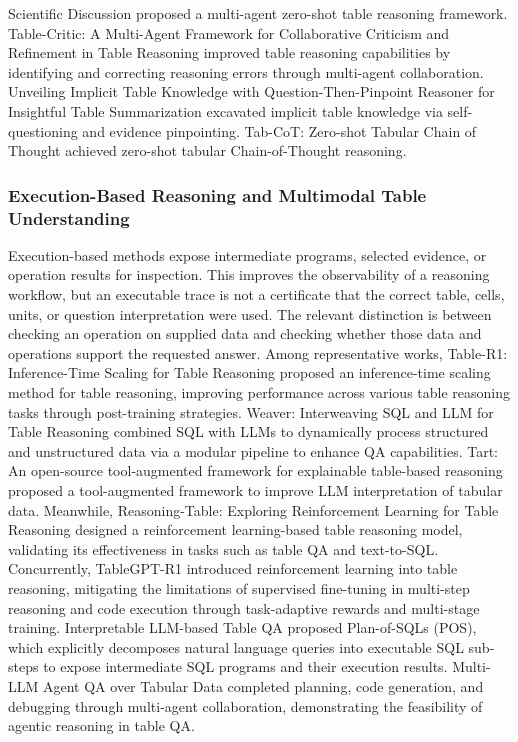 Scientific Discussion \cite{liu2024paneltr} proposed a multi-agent zero-shot table reasoning framework. Table-Critic: A Multi-Agent Framework for Collaborative Criticism and Refinement in Table Reasoning \cite{zhang2024tablecritic} improved table reasoning capabilities by identifying and correcting reasoning errors through multi-agent collaboration. Unveiling Implicit Table Knowledge with Question-Then-Pinpoint Reasoner for Insightful Table Summarization \cite{kim2024qtp} excavated implicit table knowledge via self-questioning and evidence pinpointing. Tab-CoT: Zero-shot Tabular Chain of Thought \cite{li2024tabcot} achieved zero-shot tabular Chain-of-Thought reasoning.

\subsubsection{Execution-Based Reasoning and Multimodal Table Understanding}
Execution-based methods expose intermediate programs, selected evidence, or operation results for inspection. This improves the observability of a reasoning workflow, but an executable trace is not a certificate that the correct table, cells, units, or question interpretation were used. The relevant distinction is between checking an operation on supplied data and checking whether those data and operations support the requested answer. Among representative works, Table-R1: Inference-Time Scaling for Table Reasoning \cite{yang2025tablegpt1} proposed an inference-time scaling method for table reasoning, improving performance across various table reasoning tasks through post-training strategies. Weaver: Interweaving SQL and LLM for Table Reasoning \cite{weaver2025} combined SQL with LLMs to dynamically process structured and unstructured data via a modular pipeline to enhance QA capabilities. Tart: An open-source tool-augmented framework for explainable table-based reasoning \cite{tart2024} proposed a tool-augmented framework to improve LLM interpretation of tabular data. Meanwhile, Reasoning-Table: Exploring Reinforcement Learning for Table Reasoning \cite{reasoningtable2025} designed a reinforcement learning-based table reasoning model, validating its effectiveness in tasks such as table QA and text-to-SQL. Concurrently, TableGPT-R1 \cite{yang2025tablegpt} introduced reinforcement learning into table reasoning, mitigating the limitations of supervised fine-tuning in multi-step reasoning and code execution through task-adaptive rewards and multi-stage training. Interpretable LLM-based Table QA \cite{nguyen2024interpretable} proposed Plan-of-SQLs (POS), which explicitly decomposes natural language queries into executable SQL sub-steps to expose intermediate SQL programs and their execution results. Multi-LLM Agent QA over Tabular Data \cite{bangar-etal-2025-exploration} completed planning, code generation, and debugging through multi-agent collaboration, demonstrating the feasibility of agentic reasoning in table QA.

